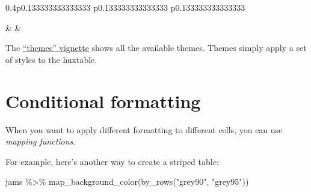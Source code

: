 \documentclass[
]{article}
\newenvironment{Shaded}{\begin{snugshade}}{\end{snugshade}}
\newcommand{\FunctionTok}[1]{\textcolor[rgb]{0.00,0.00,0.00}{#1}}
\newcommand{\NormalTok}[1]{#1}
\newcommand{\SpecialCharTok}[1]{\textcolor[rgb]{0.00,0.00,0.00}{#1}}
\newcommand{\StringTok}[1]{\textcolor[rgb]{0.31,0.60,0.02}{#1}}
\begin{document}
\begin{table}[ht]
\begin{centerbox}
\begin{threeparttable}
\begin{tabularx}{0.4\textwidth}{p{} p{} p{}}

 &
 &
 \tabularnewline[-0.5pt]


\end{tabularx}
\end{threeparttable}\par\end{centerbox}

\end{table}
 

\FloatBarrier

The \href{themes.html}{``themes'' vignette} shows all the available
themes. Themes simply apply a set of styles to the huxtable.

\hypertarget{conditional-formatting}{%
\section{Conditional formatting}\label{conditional-formatting}}

When you want to apply different formatting to different cells, you can
use \emph{mapping functions}.

For example, here's another way to create a striped table:

\begin{Shaded}
\begin{Highlighting}[]
\NormalTok{jams }\SpecialCharTok{\%\textgreater{}\%} \FunctionTok{map\_background\_color}\NormalTok{(}\FunctionTok{by\_rows}\NormalTok{(}\StringTok{"grey90"}\NormalTok{, }\StringTok{"grey95"}\NormalTok{))}
\end{Highlighting}
\end{Shaded}

 
  \providecommand{\huxb}[2]{\arrayrulecolor[RGB]{#1}\global\arrayrulewidth=#2pt}
  \providecommand{\huxvb}[2]{\color[RGB]{#1}\vrule width #2pt}
  \providecommand{\huxtpad}[1]{\rule{0pt}{#1}}
  \providecommand{\huxbpad}[1]{\rule[-#1]{0pt}{#1}}
\end{document}
